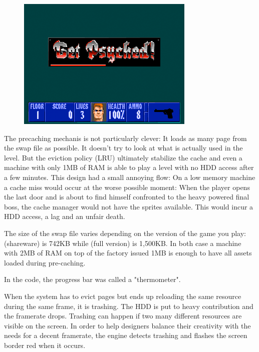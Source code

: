 \documentclass[book.tex]{subfiles}
\begin{document}
\begin{figure}[H]
\centering
 \includegraphics[width=\textwidth]{imgs/get_psyched.png}
 \end{figure}
 \par
The precaching mechanis is not particularly clever: It loads as many page from the swap file as possible. It doesn't try to look at what is actually used in the level. But the eviction policy (LRU) ultimately stabilize the cache and even a machine with only 1MB of RAM is able to play a level with no HDD access after a few minutes. This design had a small annoying flow: On a low memory machine a cache miss would occur at the worse possible moment: When the player opens the last door and is about to find himself confronted to the heavy powered final boss, the cache manager would not have the sprites available. This would incur a HDD access, a lag and an unfair death.\\
\par
The size of the swap file varies depending on the version of the game you play:  (shareware) is 742KB while  (full version) is 1,500KB. In both case a machine with 2MB of RAM on top of the factory issued 1MB is enough to have all assets loaded during pre-caching.\\
\par
{} In the code, the progress bar was called a "thermometer".\\
\par
{} When the system has to evict pages but ends up reloading the same resource during the same frame, it is trashing. The HDD is put to heavy contribution and the framerate drops. Trashing can happen if two many different resources are visible on the screen. In order to help designers balance their creativity with the needs for a decent framerate, the engine detects trashing and flashes the screen border red when it occurs.\\
\end{document}
